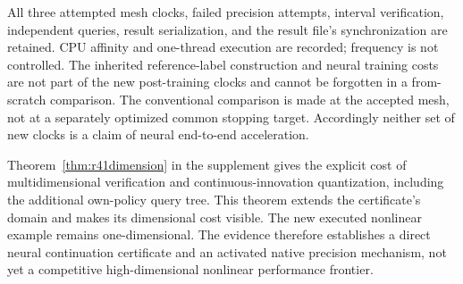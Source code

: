 All three attempted mesh clocks, failed precision attempts, interval
verification, independent queries, result serialization, and the result
file's synchronization are retained. CPU affinity and one-thread execution
are recorded; frequency is not controlled. The inherited reference-label
construction and neural training costs are not part of the new
post-training clocks and cannot be forgotten in a from-scratch comparison.
The conventional comparison is made at the accepted mesh, not at a
separately optimized common stopping target. Accordingly neither set of
new clocks is a claim of neural end-to-end acceleration.

Theorem~\ref{thm:r41dimension} in the supplement gives the explicit cost of
multidimensional verification and continuous-innovation quantization,
including the additional own-policy query tree. This theorem extends the
certificate's domain and makes its dimensional cost visible. The new
executed nonlinear example remains one-dimensional. The evidence therefore
establishes a direct neural continuation certificate and an activated native
precision mechanism, not yet a competitive high-dimensional nonlinear
performance frontier.
